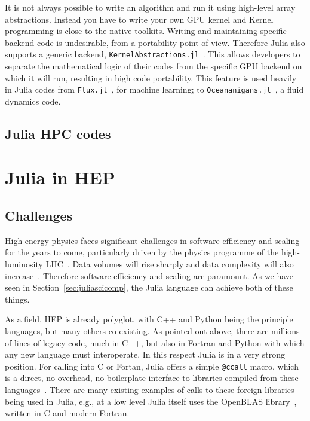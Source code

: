 \documentclass{webofc}
\begin{document}
It is not always possible to write an algorithm and run it using high-level
array abstractions. Instead you have to write your own GPU kernel and Kernel
programming is close to the native toolkits.  Writing and maintaining specific
backend code is undesirable, from a portability point of view. Therefore Julia
also supports a generic backend,
\texttt{KernelAbstractions.jl}~\cite{BESARD201929,8471188}. This allows
developers to separate the mathematical logic of their codes from the specific
GPU backend on which it will run, resulting in high code portability. This
feature is used heavily in Julia codes from \texttt{Flux.jl}~\cite{innes:2018},
for machine learning; to
\texttt{Oceananigans.jl}~\cite{Ramadhan_Oceananigans_jl_Fast_and_2020}, a fluid
dynamics code.

\subsection{Julia HPC codes}

\section{Julia in HEP}

\subsection{Challenges}

High-energy physics faces significant challenges in software efficiency and
scaling for the years to come, particularly driven by the physics programme of
the high-luminosity LHC~\cite{hsfcwp}. Data volumes will rise sharply and data
complexity will also
increase~\cite{CERN-LHCC-2022-005,Software:2815292,Valassi2021}. Therefore
software efficiency and scaling are paramount. As we have seen in
Section~\ref{sec:juliascicomp}, the Julia language can achieve both of these
things.

As a field, HEP is already polyglot, with C++ and Python being the principle
languages, but many others co-existing. As pointed out above, there are millions
of lines of legacy code, much in C++, but also in Fortran and Python with which
any new language must interoperate. In this respect Julia is in a very strong
position. For calling into C or Fortan, Julia offers a simple \texttt{@ccall}
macro, which is a direct, no overhead, no boilerplate interface to libraries
compiled from these languages~\cite{JuliaManualCCall}. There are many existing
examples of calls to these foreign libraries being used in Julia, e.g., at a low
level Julia itself uses the OpenBLAS library~\cite{6877458}, written in C and
modern Fortran. 
\end{document}
